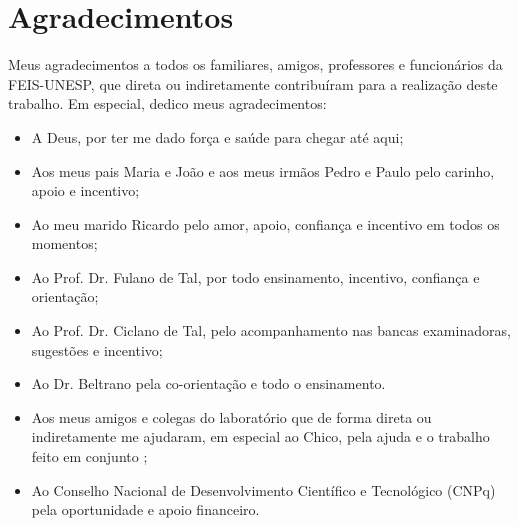 \chapter*{Agradecimentos}

\vspace*{-0.5cm}

Meus agradecimentos a todos os familiares, amigos, professores e funcionários da FEIS-UNESP, que direta ou indiretamente contribuíram para a realização deste trabalho.
Em especial, dedico meus agradecimentos:

\begin{itemize}
	\item A Deus, por ter me dado força e saúde para chegar até aqui;
	\item Aos meus pais Maria e João e aos meus irmãos Pedro e Paulo pelo carinho, apoio e incentivo;
	\item Ao meu marido Ricardo pelo amor, apoio, confiança e incentivo  em todos os momentos;
	\item Ao Prof. Dr. Fulano de Tal, por todo ensinamento, incentivo, confiança e orientação;
	\item Ao Prof. Dr. Ciclano de Tal,  pelo acompanhamento nas bancas examinadoras, sugestões e incentivo;
    \item Ao Dr. Beltrano pela co-orientação e todo o ensinamento.
	\item	Aos meus amigos e colegas do laboratório que de forma direta ou indiretamente me ajudaram, em especial ao Chico, pela ajuda e o trabalho feito em conjunto ;
	\item Ao Conselho Nacional de Desenvolvimento Científico e Tecnológico (CNPq) pela oportunidade e apoio financeiro.

\end{itemize} 
